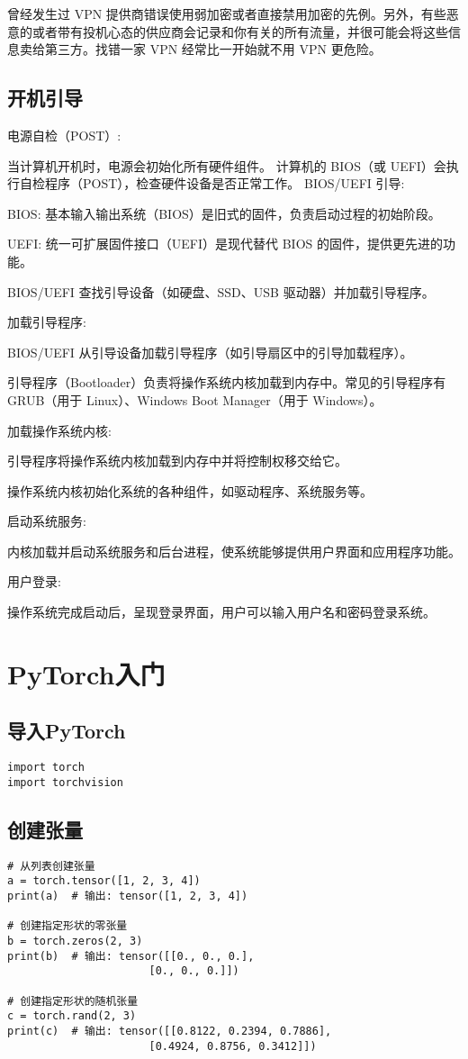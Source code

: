 \documentclass[a4paper, 12pt]{article}
\begin{document}
曾经发生过 VPN 提供商错误使用弱加密或者直接禁用加密的先例。另外，有些恶意的或者带有投机心态的供应商会记录和你有关的所有流量，并很可能会将这些信息卖给第三方。找错一家 VPN 经常比一开始就不用 VPN 更危险。

\subsection{开机引导}
电源自检（POST）:

当计算机开机时，电源会初始化所有硬件组件。
计算机的 BIOS（或 UEFI）会执行自检程序（POST），检查硬件设备是否正常工作。
BIOS/UEFI 引导:

BIOS: 基本输入输出系统（BIOS）是旧式的固件，负责启动过程的初始阶段。

UEFI: 统一可扩展固件接口（UEFI）是现代替代 BIOS 的固件，提供更先进的功能。

BIOS/UEFI 查找引导设备（如硬盘、SSD、USB 驱动器）并加载引导程序。

加载引导程序:

BIOS/UEFI 从引导设备加载引导程序（如引导扇区中的引导加载程序）。

引导程序（Bootloader）负责将操作系统内核加载到内存中。常见的引导程序有 GRUB（用于 Linux）、Windows Boot Manager（用于 Windows）。

加载操作系统内核:

引导程序将操作系统内核加载到内存中并将控制权移交给它。

操作系统内核初始化系统的各种组件，如驱动程序、系统服务等。

启动系统服务:

内核加载并启动系统服务和后台进程，使系统能够提供用户界面和应用程序功能。

用户登录:

操作系统完成启动后，呈现登录界面，用户可以输入用户名和密码登录系统。

\section{PyTorch入门}
\subsection{导入PyTorch}
\begin{lstlisting}
import torch
import torchvision

\end{lstlisting}


\subsection{创建张量}
\begin{lstlisting}
# 从列表创建张量
a = torch.tensor([1, 2, 3, 4])
print(a)  # 输出: tensor([1, 2, 3, 4])

# 创建指定形状的零张量
b = torch.zeros(2, 3)
print(b)  # 输出: tensor([[0., 0., 0.],
                      [0., 0., 0.]])

# 创建指定形状的随机张量
c = torch.rand(2, 3)
print(c)  # 输出: tensor([[0.8122, 0.2394, 0.7886],
                      [0.4924, 0.8756, 0.3412]])

\end{lstlisting}
\end{document}

